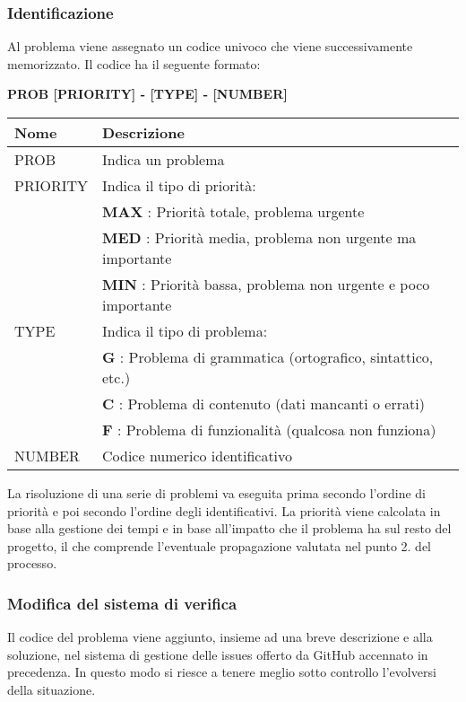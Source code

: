 \subsubsection{Identificazione}
Al problema viene assegnato un codice univoco che viene successivamente memorizzato. \newline 
Il codice ha il seguente formato: 
\begin{center}
    \textbf{PROB [PRIORITY] - [TYPE] - [NUMBER]}
\end{center}
\renewcommand{\arraystretch}{1.8} %
    \begin{tabular}{ |m{7em}|m{30em}| }
        \hline
        \textbf{Nome} & \textbf{Descrizione} \\
        \hline
            PROB & Indica un problema \\
        \hline
            PRIORITY 	& 	Indica il tipo di priorità: \\
                        &	\textbf{MAX} : Priorità totale, problema urgente \\
                        &	\textbf{MED} : Priorità media, problema non urgente ma importante \\
                        &	\textbf{MIN} : Priorità bassa, problema non urgente e poco importante \\
        \hline
                    
            TYPE 	& 	Indica il tipo di problema: \\
                    & 	\textbf{G} : Problema di grammatica (ortografico, sintattico, etc.) \\
                    &	\textbf{C} : Problema di contenuto (dati mancanti o errati) \\
                    &	\textbf{F} : Problema di funzionalità (qualcosa non funziona) \\
        \hline
            NUMBER & Codice numerico identificativo \\
        \hline
    \end{tabular} \newline \newline
La risoluzione di una serie di problemi va eseguita prima secondo l'ordine di priorità e poi secondo l'ordine degli identificativi. \newline 
La priorità viene calcolata in base alla gestione dei tempi e in base all'impatto che il problema ha sul resto del progetto, il che comprende l'eventuale propagazione valutata nel punto 2. del processo.
\subsubsection{Modifica del sistema di verifica}
Il codice del problema viene aggiunto, insieme ad una breve descrizione e alla soluzione, nel sistema di gestione delle issues offerto da GitHub accennato in precedenza.
In questo modo si riesce a tenere meglio sotto controllo l'evolversi della situazione.